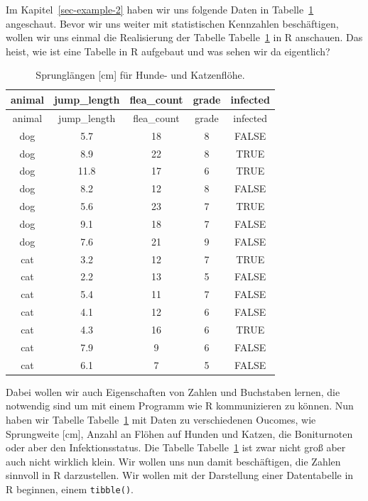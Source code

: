 \documentclass[
  letterpaper,
  DIV=11,
  oneside]{scrreport}
\begin{document}
Im Kapitel~\ref{sec-example-2} haben wir uns folgende Daten in
Tabelle~\ref{tbl-dog-cat-letter} angeschaut. Bevor wir uns weiter mit
statistischen Kennzahlen beschäftigen, wollen wir uns einmal die
Realisierung der Tabelle Tabelle~\ref{tbl-dog-cat-letter} in R
anschauen. Das heist, wie ist eine Tabelle in R aufgebaut und was sehen
wir da eigentlich?

\hypertarget{tbl-dog-cat-letter}{}
\begin{longtable}[]{@{}ccccc@{}}
\caption{\label{tbl-dog-cat-letter}Sprunglängen {[}cm{]} für Hunde- und
Katzenflöhe.}\tabularnewline
\toprule()
animal & jump\_length & flea\_count & grade & infected \\
\midrule()
\endfirsthead
\toprule()
animal & jump\_length & flea\_count & grade & infected \\
\midrule()
\endhead
dog & 5.7 & 18 & 8 & FALSE \\
dog & 8.9 & 22 & 8 & TRUE \\
dog & 11.8 & 17 & 6 & TRUE \\
dog & 8.2 & 12 & 8 & FALSE \\
dog & 5.6 & 23 & 7 & TRUE \\
dog & 9.1 & 18 & 7 & FALSE \\
dog & 7.6 & 21 & 9 & FALSE \\
cat & 3.2 & 12 & 7 & TRUE \\
cat & 2.2 & 13 & 5 & FALSE \\
cat & 5.4 & 11 & 7 & FALSE \\
cat & 4.1 & 12 & 6 & FALSE \\
cat & 4.3 & 16 & 6 & TRUE \\
cat & 7.9 & 9 & 6 & FALSE \\
cat & 6.1 & 7 & 5 & FALSE \\
\bottomrule()
\end{longtable}

Dabei wollen wir auch Eigenschaften von Zahlen und Buchstaben lernen,
die notwendig sind um mit einem Programm wie R kommunizieren zu können.
Nun haben wir Tabelle Tabelle~\ref{tbl-dog-cat-letter} mit Daten zu
verschiedenen Oucomes, wie Sprungweite {[}cm{]}, Anzahl an Flöhen auf
Hunden und Katzen, die Boniturnoten oder aber den Infektionsstatus. Die
Tabelle Tabelle~\ref{tbl-dog-cat-letter} ist zwar nicht groß aber auch
nicht wirklich klein. Wir wollen uns nun damit beschäftigen, die Zahlen
sinnvoll in R darzustellen. Wir wollen mit der Darstellung einer
Datentabelle in R beginnen, einem \texttt{tibble()}.
\end{document}
